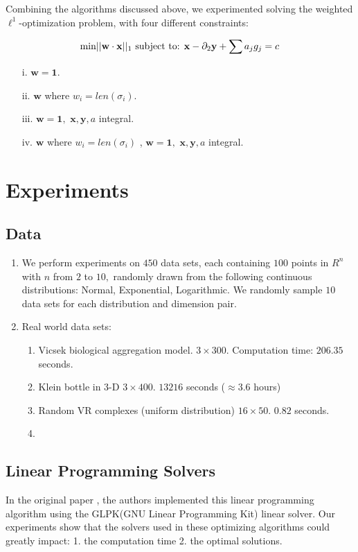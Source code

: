 \documentclass[11pt]{article}
\begin{document}
Combining the algorithms discussed above, we experimented solving the weighted $\ell^1$-optimization problem, with four different constraints: 

$$\text{min} ||\mathbf{w} \cdot \mathbf{x}||_1 \text{ subject to: } \\ \mathbf{x} - \partial_{2} \mathbf{y} + \sum a_jg_j = c $$
\begin{enumerate}
    \item[i.] $\mathbf{w} = \mathbf{1}.$
    \item[ii.] $\mathbf{w}$ where $w_i = len(\sigma_i).$
    \item[iii.] $\mathbf{w} = \mathbf{1},$ $\mathbf{x}, \mathbf{y}, a$ integral. 
    \item[iv.]  $\mathbf{w}$ where $w_i = len(\sigma_i)$ , $\mathbf{w} = \mathbf{1},$ $\mathbf{x}, \mathbf{y}, a$ integral. 
\end{enumerate}

\section{Experiments}

\subsection{Data}
\begin{enumerate}
    \item We perform experiments on $450$ data sets, each containing $100$ points in $R^n$ with $n$ from $2$ to $10,$ randomly drawn from the following  continuous distributions: Normal, Exponential,  Logarithmic. We randomly sample $10$ data sets for each distribution and dimension pair. 
    \item Real world data sets:
    \begin{enumerate}
        \item Vicsek biological aggregation model. $3 \times 300.$ Computation time: $206.35$ seconds. 
        \item Klein bottle in $3$-D $3\times 400$.   $13216$ seconds ($\approx 3.6$ hours)
        \item Random VR complexes (uniform distribution) $16\times 50$. $0.82$ seconds.
        \item 
    \end{enumerate}
\end{enumerate}


\subsection{Linear Programming Solvers}
In the original paper \cite{Escolar2016}, the authors implemented this linear programming algorithm using the GLPK(GNU Linear Programming Kit) linear solver. 
Our experiments show that the solvers used in these optimizing algorithms could greatly impact: 1. the computation time 2. the optimal solutions. \\
\end{document}
